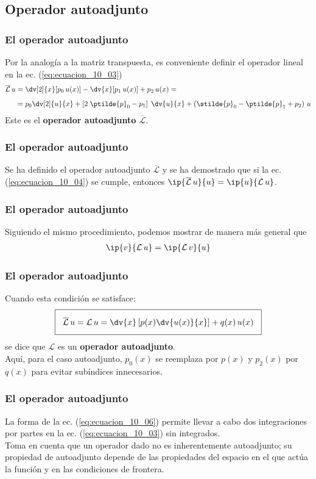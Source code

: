 \subsection{Operador autoadjunto}
\begin{frame}
\frametitle{El operador autoadjunto}
Por la analogía a la matriz transpuesta, es conveniente definir el operador lineal en la ec. (\ref{eq:ecuacion_10_03})
\begin{align}
\begin{aligned}[b]
\overline{\mathcal{L}} \, u &= \dv[2]{x} [ p_{0} \, u(x)] - \dv{x} [p_{1} \, u(x)] + p_{2} \, u(x) = \\[0.5em]
&= p_{0} \dv[2]{u}{x} + \left[ 2 \; \ptilde{p}_{0} - p_{1} \right] \; \dv{u}{x} + \left( \stilde{p}_{0} - \ptilde{p}_{1} + p_{2} \right) \, u
\label{eq:ecuacion_10_05}
\end{aligned}
\end{align}
Este es el \textbf{operador autoadjunto $\overline{\mathcal{L}}$}.
\end{frame}
\begin{frame}
\frametitle{El operador autoadjunto}
Se ha definido el operador autoadjunto $\overline{\mathcal{L}}$ y se ha demostrado que si la ec. (\ref{eq:ecuacion_10_04}) se cumple, entonces $\ip{\overline{\mathcal{L}} \, u}{u} = \ip{u}{\mathcal{L} \, u}$.
\end{frame}
\begin{frame}
\frametitle{El operador autoadjunto}
Siguiendo el mismo procedimiento, podemos mostrar de manera más general que
\begin{align*}
\ip{v}{\mathcal{L} \, u} = \ip{\mathcal{L} \, v}{u}\end{align*}
\end{frame}
\begin{frame}
\frametitle{El operador autoadjunto}
Cuando esta condición se satisface:
\begin{equation}
\setlength{\fboxsep}{3\fboxsep}\boxed{\overline{\mathcal{L}} \, u = \mathcal{L} \, u = \dv{x} \left[ p(x) \dv{u(x)}{x} \right] + q(x) \, u(x)}
\label{eq:ecuacion_10_06}
\end{equation}
se dice que $\mathcal{L}$ es un \textbf{operador autoadjunto}. 
\\
\bigskip
\pause
Aquí, para el caso autoadjunto, $p_{0}(x)$ se reemplaza por $p(x)$ y $p_{2}(x)$ por $q(x)$ para evitar subíndices innecesarios.
\end{frame}
\begin{frame}
\frametitle{El operador autoadjunto}
La forma de la ec. (\ref{eq:ecuacion_10_06}) permite llevar a cabo dos integraciones por partes en la ec. (\ref{eq:ecuacion_10_03}) sin integrados.
\\
\bigskip
\pause
Toma en cuenta que un operador dado no es inherentemente autoadjunto; su propiedad de autoadjunto depende de las propiedades del espacio en el que actúa la función y en las condiciones de frontera.
\end{frame}
